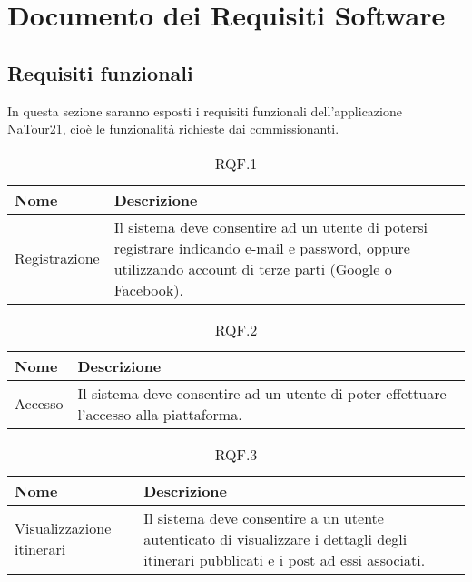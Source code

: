 \documentclass{natourDoc}
\begin{document}
	\section{Documento dei Requisiti Software}
	\subsection{Requisiti funzionali}
	In questa sezione saranno esposti i requisiti funzionali dell'applicazione NaTour21, cioè le funzionalità richieste dai commissionanti.
	
	\begin{table}[H]
		\centering
		\begin{tabular}{ |p{5cm}|p{10.3cm}| } 
			\hline
			\rowcolor{PineGreen!70}
			\textbf{Nome} & \textbf{Descrizione} \\
			\hline
			Registrazione & Il sistema deve consentire ad un utente di potersi registrare indicando e-mail e password, oppure utilizzando account di terze parti (Google o Facebook).\\ 
			\hline
		\end{tabular}
		\caption{RQF.1}
		\label{table:1}
	\end{table}
	
	\begin{table}[H]
		\centering
		\begin{tabular}{ |p{5cm}|p{10.3cm}| } 
			\hline
			\rowcolor{PineGreen!70}
			\textbf{Nome} & \textbf{Descrizione} \\
			\hline
			Accesso & Il sistema deve consentire ad un utente di poter effettuare l'accesso alla piattaforma.\\ 
			\hline
		\end{tabular}
		\caption{RQF.2}
		\label{table:2}
	\end{table}
	
	\begin{table}[H]
		\centering
		\begin{tabular}{ |p{5cm}|p{10.3cm}| }
			\hline
			\rowcolor{PineGreen!70}
			\textbf{Nome} & \textbf{Descrizione} \\
			\hline
			Visualizzazione itinerari & Il sistema deve consentire a un utente autenticato di visualizzare i
			dettagli degli itinerari pubblicati e i post ad essi associati. \\
			\hline
		\end{tabular}
		\caption{RQF.3}
		\label{table:3}
	\end{table}
\end{document}
